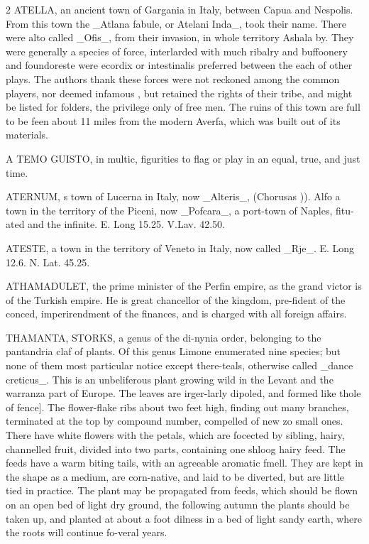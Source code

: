 \documentclass[10pt]{article}
\begin{document}
\begin{multicols}{2}
ATELLA, an ancient town of Gargania in Italy, between Capua and Nespolis. From this town the \_Atlana fabule, or Atelani Inda\_, took their name. There were alto called \_Ofis\_, from their invasion, in whole territory Ashala by. They were generally a species of force, interlarded with much ribalry and buffoonery and foundoreste were ecordix or intestinalis preferred between the each of other plays. The authors thank these forces were not reckoned among the common players, nor deemed infamous , but retained the rights of their tribe, and might be listed for folders, the privilege only of free men. The ruins of this town are full to be feen about 11 miles from the modern Averfa, which was built out of its materials.

A TEMO GUISTO, in multic, figurities to flag or play in an equal, true, and just time.

ATERNUM, s town of Lucerna in Italy, now \_Alteris\_, (Chorusas )). Alfo a town in the territory of the Piceni, now \_Pofcara\_, a port-town of Naples, fitu-ated and the infinite. E. Long 15.25. V.Lav. 42.50.

ATESTE, a town in the territory of Veneto in Italy, now called \_Rje\_. E. Long 12.6. N. Lat. 45.25.

ATHAMADULET, the prime minister of the Perfin empire, as the grand victor is of the Turkish empire. He is great chancellor of the kingdom, pre-fident of the conced, imperirendment of the finances, and is charged with all foreign affairs.

THAMANTA, STORKS, a genus of the di-nynia order, belonging to the pantandria claf of plants. Of this genus Limone enumerated nine species; but none of them most particular notice except there-teals, otherwise called \_dance creticus\_. This is an unbeliferous plant growing wild in the Levant and the warranza part of Europe. The leaves are irger-larly dipoled, and formed like thole of fence]. The flower-flake ribs about two feet high, finding out many branches, terminated at the top by compound number, compelled of new zo small ones. There have white flowers with the petals, which are focected by sibling, hairy, channelled fruit, divided into two parts, containing one shloog hairy feed. The feeds have a warm biting tails, with an agreeable aromatic fmell. They are kept in the shape as a medium, are corn-native, and laid to be diverted, but are little tied in practice. The plant may be propagated from feeds, which should be flown on an open bed of light dry ground, the following autumn the plants should be taken up, and planted at about a foot dilness in a bed of light sandy earth, where the roots will continue fo-veral years.


\end{multicols}
\end{document}
